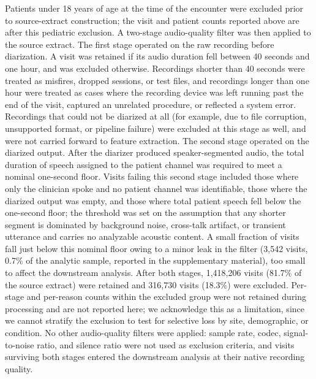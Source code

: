 \documentclass[utf8]{FrontiersinHarvard} %
\begin{document}
\label{sec:dataset-funnel}
Patients under 18 years of age at the time of the encounter were excluded prior to source-extract construction; the visit and patient counts reported above are after this pediatric exclusion. A two-stage audio-quality filter was then applied to the source extract. The first stage operated on the raw recording before diarization. A visit was retained if its audio duration fell between 40 seconds and one hour, and was excluded otherwise. Recordings shorter than 40 seconds were treated as misfires, dropped sessions, or test files, and recordings longer than one hour were treated as cases where the recording device was left running past the end of the visit, captured an unrelated procedure, or reflected a system error. Recordings that could not be diarized at all (for example, due to file corruption, unsupported format, or pipeline failure) were excluded at this stage as well, and were not carried forward to feature extraction. The second stage operated on the diarized output. After the diarizer produced speaker-segmented audio, the total duration of speech assigned to the patient channel was required to meet a nominal one-second floor. Visits failing this second stage included those where only the clinician spoke and no patient channel was identifiable, those where the diarized output was empty, and those where total patient speech fell below the one-second floor; the threshold was set on the assumption that any shorter segment is dominated by background noise, cross-talk artifact, or transient utterance and carries no analyzable acoustic content. A small fraction of visits fall just below this nominal floor owing to a minor leak in the filter (3{,}542 visits, 0.7\% of the analytic sample, reported in the supplementary material), too small to affect the downstream analysis. After both stages, 1{,}418{,}206 visits (81.7\% of the source extract) were retained and 316{,}730 visits (18.3\%) were excluded. Per-stage and per-reason counts within the excluded group were not retained during processing and are not reported here; we acknowledge this as a limitation, since we cannot stratify the exclusion to test for selective loss by site, demographic, or condition. No other audio-quality filters were applied: sample rate, codec, signal-to-noise ratio, and silence ratio were not used as exclusion criteria, and visits surviving both stages entered the downstream analysis at their native recording quality.
\end{document}
